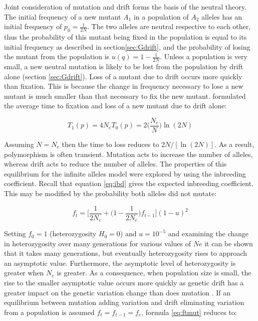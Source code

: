 Joint consideration of mutation and drift forms the basis of the neutral theory.
The initial frequency of a new mutant $A_1$ in a population of $A_2$ alleles has an initial frequency of $p_0 = \frac{1}{2N}$.
The two alleles are neutral respective to each other, thus the probability of this mutant being fixed in the population is equal to its initial frequency as described in section\ref{sec:Gdrift}, and the probability of losing the mutant from the population is $u(q) = 1 - \frac{1}{2N}$.
Unless a population is very small, a new neutral mutation is likely to be lost from the population by drift alone (section \ref{sec:Gdrift}).
Loss of a mutant due to drift occurs more quickly than fixation.
This is because the change in frequency necessary to lose a new mutant is much smaller than that necessary to fix the new mutant.
\cite{kimura1971theoretical} formulated the average time to fixation and loss of a new mutant due to drift alone:

\begin{subequations}
\begin{equation}
T_1(p) = 4N_e
\end{equation}
\begin{equation}
T_0(p) = 2\bigg(\frac{N_e}{N}\bigg)\ln(2N)
\end{equation}
\end{subequations}

Assuming $N = N_e$ then the time to loss reduces to $2N/[\ln(2N)]$.
As a result, polymorphism is often transient.
Mutation acts to increase the number of alleles, whereas drift acts to reduce the number of alleles.
The properties of this equilibrium for the infinite alleles model were explored by \cite{Kimura1964} using the inbreeding coefficient. 
Recall that equation \ref{eq:ibd} gives the expected inbreeding coefficient.
This may be modified by the probability both alleles did not mutate:

\begin{equation} \label{eq:ftmut}
f_t=\bigg[\frac{1}{2N_e}+\bigg(1-\frac{1}{2N_e}\bigg)f_{t-1}\bigg](1-u)^2
\end{equation}

Setting $f_0 = 1$ (heterozygosity $H_0 = 0$) and $u = 10^{-5}$ and examining the change in heterozygosity over many generations for various values of $Ne$ it can be shown that it takes many generations, but eventually heterozygosity rises to approach an asymptotic value.
Furthermore, the asymptotic level of heterozygosity is greater when $N_e$ is greater.
As a consequence, when population size is small, the rise to the smaller asymptotic value occurs more quickly as genetic drift has a greater impact on the genetic variation change than does mutation \parencite{Kimura1964,Hedrick2010}.
If an equilibrium between mutation adding variation and drift eliminating variation from a population is assumed $f_t=f_{t-1}=f_e$, formula \ref{eq:ftmut} reduces to:

